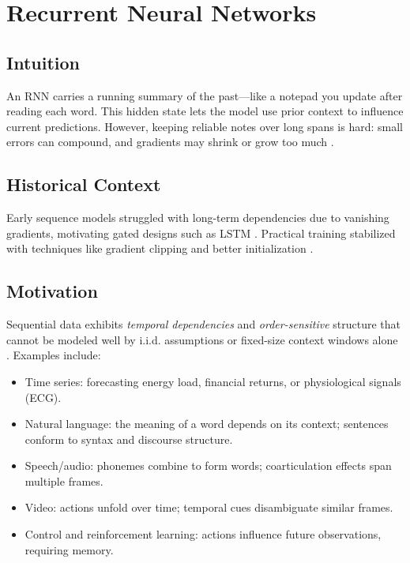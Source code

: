 
\section{Recurrent Neural Networks }
\label{sec:rnns}

\subsection*{Intuition}

An RNN carries a running summary of the past—like a notepad you update after reading each word. This hidden state lets the model use prior context to influence current predictions. However, keeping reliable notes over long spans is hard: small errors can compound, and gradients may shrink or grow too much \cite{GoodfellowEtAl2016}.

\subsection*{Historical Context}

Early sequence models struggled with long-term dependencies due to vanishing gradients, motivating gated designs such as LSTM \cite{Hochreiter1997}. Practical training stabilized with techniques like gradient clipping and better initialization \cite{GoodfellowEtAl2016}.


\subsection{Motivation}

Sequential data exhibits \emph{temporal dependencies} and \emph{order-sensitive} structure that cannot be modeled well by i.i.d. assumptions or fixed-size context windows alone \cite{GoodfellowEtAl2016,Prince2023,Bishop2006}. Examples include:
\begin{itemize}
    \item Time series: forecasting energy load, financial returns, or physiological signals (ECG).
    \item Natural language: the meaning of a word depends on its context; sentences conform to syntax and discourse structure.
    \item Speech/audio: phonemes combine to form words; coarticulation effects span multiple frames.
    \item Video: actions unfold over time; temporal cues disambiguate similar frames.
    \item Control and reinforcement learning: actions influence future observations, requiring memory.
\end{itemize}


